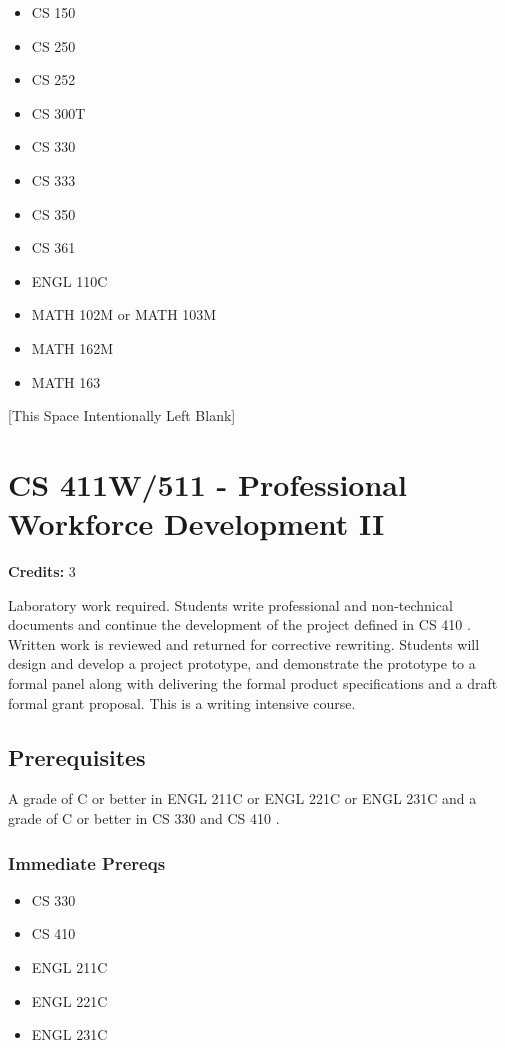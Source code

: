 \documentclass[]{article}
\providecommand{\tightlist}{%
  \setlength{\itemsep}{0pt}\setlength{\parskip}{0pt}}
\newcommand{\pagebreakhere}{
\vspace*{\fill}
\begin{center}
[This Space Intentionally Left Blank]
\end{center}
\vspace*{\fill}
\newpage
}
\begin{document}
\begin{itemize}
\tightlist
\item
  CS 150
\item
  CS 250
\item
  CS 252
\item
  CS 300T
\item
  CS 330
\item
  CS 333
\item
  CS 350
\item
  CS 361
\item
  ENGL 110C
\item
  MATH 102M or MATH 103M
\item
  MATH 162M
\item
  MATH 163
\end{itemize}

\pagebreakhere
\section{CS 411W/511 - Professional Workforce Development
II}\label{cs-411w511---professional-workforce-development-ii}

\textbf{Credits:} 3

Laboratory work required. Students write professional and non-technical
documents and continue the development of the project defined in CS 410
. Written work is reviewed and returned for corrective rewriting.
Students will design and develop a project prototype, and demonstrate
the prototype to a formal panel along with delivering the formal product
specifications and a draft formal grant proposal. This is a writing
intensive course.

\subsection{Prerequisites}\label{prerequisites-27}

A grade of C or better in ENGL 211C or ENGL 221C or ENGL 231C and a
grade of C or better in CS 330 and CS 410 .

\subsubsection{Immediate Prereqs}\label{immediate-prereqs-19}

\begin{itemize}
\tightlist
\item
  CS 330
\item
  CS 410
\item
  ENGL 211C
\item
  ENGL 221C
\item
  ENGL 231C
\end{itemize}
\end{document}
